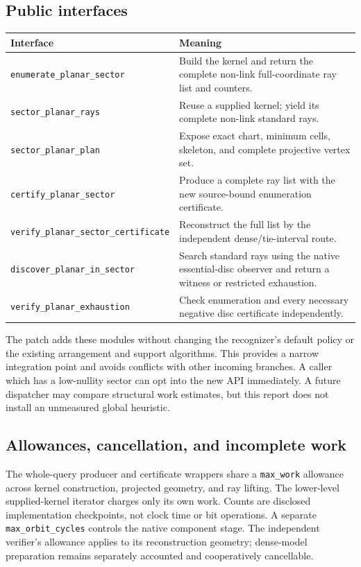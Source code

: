 \documentclass[11pt,letterpaper]{article}
\theoremstyle{definition}
\theoremstyle{remark}\newtheorem{remark}[theorem]{Remark}
\newcommand{\code}[1]{\nolinkurl{#1}}
\begin{document}

\subsection{Public interfaces}

\begin{center}
\begin{tabularx}{\linewidth}{@{}p{.49\linewidth}X@{}}
\toprule
Interface & Meaning \\
\midrule
\code{enumerate_planar_sector} & Build the kernel and return the complete
non-link full-coordinate ray list and counters.\\
\code{sector_planar_rays} & Reuse a supplied kernel; yield its complete
non-link standard rays.\\
\code{sector_planar_plan} & Expose exact chart, minimum cells, skeleton,
and complete projective vertex set.\\
\code{certify_planar_sector} & Produce a complete ray list with the new
source-bound enumeration certificate.\\
\code{verify_planar_sector_certificate} & Reconstruct the full list by
the independent dense/tie-interval route.\\
\code{discover_planar_in_sector} & Search standard rays using the native
essential-disc observer and return a witness or restricted exhaustion.\\
\code{verify_planar_exhaustion} & Check enumeration and every necessary
negative disc certificate independently.\\
\bottomrule
\end{tabularx}
\end{center}

The patch adds these modules without changing the recognizer's default
policy or the existing arrangement and support algorithms. This provides
a narrow integration point and avoids conflicts with other incoming
branches. A caller which has a low-nullity sector can opt into the new
API immediately. A future dispatcher may compare structural work estimates,
but this report does not install an unmeasured global heuristic.

\subsection{Allowances, cancellation, and incomplete work}

The whole-query producer and certificate wrappers share a
\code{max_work} allowance across kernel construction, projected geometry,
and ray lifting. The lower-level supplied-kernel iterator charges only
its own work. Counts are disclosed implementation checkpoints, not clock
time or bit operations. A separate \code{max_orbit_cycles} controls the
native component stage. The independent verifier's allowance applies to
its reconstruction geometry; dense-model preparation remains separately
accounted and cooperatively cancellable.
\end{document}

